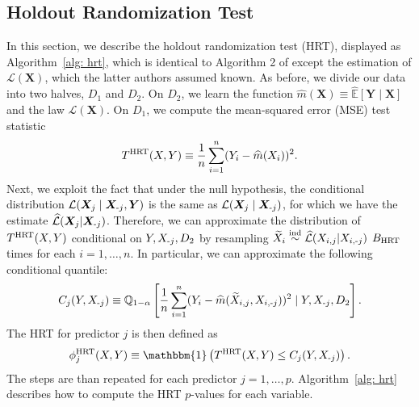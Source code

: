 \documentclass[12pt]{article}
\theoremstyle{definition}
\theoremstyle{remark}
\newcommand{\E}{\mathbb E}								%
\newcommand{\Q}{\mathbb{Q}}								%
\newcommand{\indsim}{\stackrel{\mathrm{ind}}{\sim}}		%
\newcommand{\prx}{\bm X}								%
\newcommand{\srx}{X}									%
\newcommand{\pry}{{\bm Y}}								%
\newcommand{\sry}{Y}									%
\newcommand{\law}{\mathcal L}							%
\newcommand{\lawhat}{\widehat{\mathcal L}}				%
\newcommand{\minus}{\textnormal{-}} 						    %
\begin{document}
\subsection{Holdout Randomization Test} 
In this section, we describe the holdout randomization test (HRT), displayed as Algorithm~\ref{alg: hrt}, which is identical to Algorithm 2 of \citet{Tansey2018} except the estimation of $\law(\prx)$, which the latter authors assumed known. As before, we divide our data into two halves, $D_1$ and $D_2$. On $D_2$, we learn the function $\widehat{m}(\prx) \equiv \widehat{\E}[\pry \mid \prx]$ and the law $\lawhat(\prx)$. On $D_1$, we compute the mean-squared error (MSE) test statistic
\begin{equation}\label{eq:HRT-test}
	T^{\textnormal{HRT}}(\srx, \sry) \equiv \frac{1}{n} \sum_{i=1}^n (\sry_i - \widehat{m}(\srx_i))^2.
\end{equation}
Next, we exploit the fact that under the null hypothesis, the conditional distribution $\law(\prx_j \mid \prx_{\minus j}, \pry)$ is the same as $\law(\prx_j \mid \prx_{\minus j})$, for which we have the estimate $\lawhat(\prx_j|\prx_{\minus j})$. Therefore, we can approximate the distribution of $T^{\textnormal{HRT}}(\srx, \sry)$ conditional on $\sry, \srx_{\minus j},D_2$ by resampling $\widetilde \srx_i \indsim \lawhat(\srx_{i,j}|\srx_{i,\minus j})$ $B_{\textnormal{HRT}}$ times for each $i=1,\ldots,n$. In particular, we can approximate the following conditional quantile:
\begin{equation*}
	C_j(\sry,\srx_{\minus j}) \equiv \Q_{1-\alpha}\left[\frac{1}{n} \sum_{i=1}^n (\sry_i - \widehat m(\widetilde{\srx}_{i,j},\srx_{i,\minus j}))^2 \mid \sry, \srx_{\minus j},D_2\right].
\end{equation*}
The HRT for predictor $j$ is then defined as
\begin{equation*}
\phi_j^{\textnormal{HRT}}(\srx,\sry) \equiv \mathbbm{1}\left(T^{\textnormal{HRT}}(\srx,\sry) \leq C_j(\sry,\srx_{\minus j}) \right).
\end{equation*}
The steps are than repeated for each predictor $j = 1,\ldots,p$. Algorithm~\ref{alg: hrt} describes how to compute the HRT $p$-values for each variable. 
\end{document}
